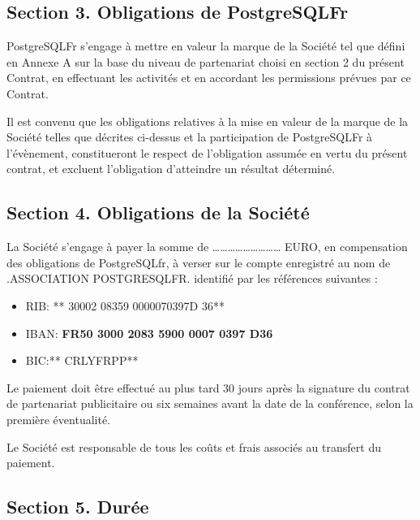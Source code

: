 \documentclass[]{article}
\providecommand{\tightlist}{%
  \setlength{\itemsep}{0pt}\setlength{\parskip}{0pt}}
\begin{document}
\hypertarget{section-3.-obligations-de-postgresqlfr}{%
\subsection{Section 3. Obligations de
PostgreSQLFr}\label{section-3.-obligations-de-postgresqlfr}}

PostgreSQLFr s'engage à mettre en valeur la marque de la Société tel que
défini en Annexe A sur la base du niveau de partenariat choisi en
section 2 du présent Contrat, en effectuant les activités et en
accordant les permissions prévues par ce Contrat.

Il est convenu que les obligations relatives à la mise en valeur de la
marque de la Société telles que décrites ci-dessus et la participation
de PostgreSQLFr à l'évènement, constitueront le respect de l'obligation
assumée en vertu du présent contrat, et excluent l'obligation
d'atteindre un résultat déterminé.

\hypertarget{section-4.-obligations-de-la-sociuxe9tuxe9}{%
\subsection{Section 4. Obligations de la
Société}\label{section-4.-obligations-de-la-sociuxe9tuxe9}}

La Société s'engage à payer la somme de
\ldots{}\ldots{}\ldots{}\ldots{}\ldots{}\ldots{}\ldots{}\ldots{}\ldots{}
EURO, en compensation des obligations de PostgreSQLfr, à verser sur le
compte enregistré au nom de .ASSOCIATION POSTGRESQLFR. identifié par les
références suivantes :

\begin{itemize}
\tightlist
\item
  RIB: ** 30002 08359 0000070397D 36**
\item
  IBAN: \textbf{FR50 3000 2083 5900 0007 0397 D36}
\item
  BIC:** CRLYFRPP**
\end{itemize}

Le paiement doit être effectué au plus tard 30 jours après la signature
du contrat de partenariat publicitaire ou six semaines avant la date de
la conférence, selon la première éventualité.

Le Société est responsable de tous les coûts et frais associés au
transfert du paiement.

\hypertarget{section-5.-duruxe9e}{%
\subsection{Section 5. Durée}\label{section-5.-duruxe9e}}
\end{document}
